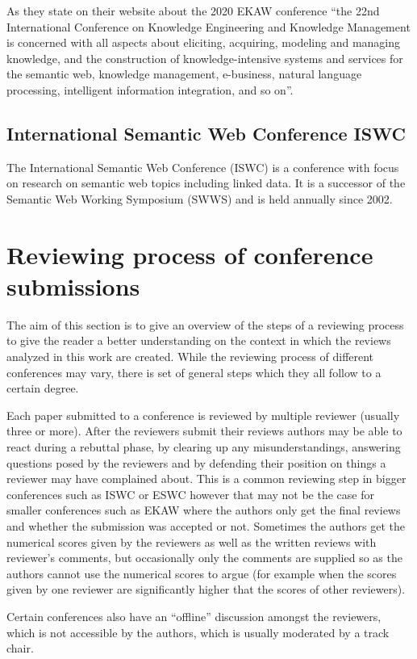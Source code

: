 As they state on their website about the 2020 EKAW conference ``the 22nd International Conference on Knowledge Engineering and Knowledge Management is concerned with all aspects about eliciting, acquiring, modeling and managing knowledge, and the construction of knowledge-intensive systems and services for the semantic web, knowledge management, e-business, natural language processing, intelligent information integration, and so on''\cite{ekaw_2020}.
\subsection{International Semantic Web Conference ISWC}
The International Semantic Web Conference (ISWC) is a conference with focus on research on semantic web topics including linked data. It is a successor of the Semantic Web Working Symposium (SWWS) and is held annually since 2002.\cite{iswc}


\section{Reviewing process of conference submissions}
The aim of this section is to give an overview of the steps of a reviewing process to give the reader a better understanding on the context in which the reviews analyzed in this work are created.
While the reviewing process of different conferences may vary, there is set of general steps which they all follow to a certain degree. 

Each paper submitted to a conference is reviewed by multiple reviewer (usually three or more). After the reviewers submit their reviews authors may be able to react during a rebuttal phase, by clearing up any misunderstandings, answering questions posed by the reviewers and by defending their position on things a reviewer may have complained about. This is a common reviewing step in bigger conferences such as ISWC or ESWC however that may not be the case for smaller conferences such as EKAW where the authors only get the final reviews and whether the submission was accepted or not. Sometimes the authors get the numerical scores given by the reviewers as well as the written reviews with reviewer's comments, but occasionally only the comments are supplied so as the authors cannot use the numerical scores to argue (for example when the scores given by one reviewer are significantly higher that the scores of other reviewers).

Certain conferences also have an ``offline'' discussion amongst the reviewers, which is not accessible by the authors, which is usually moderated by a track chair.


